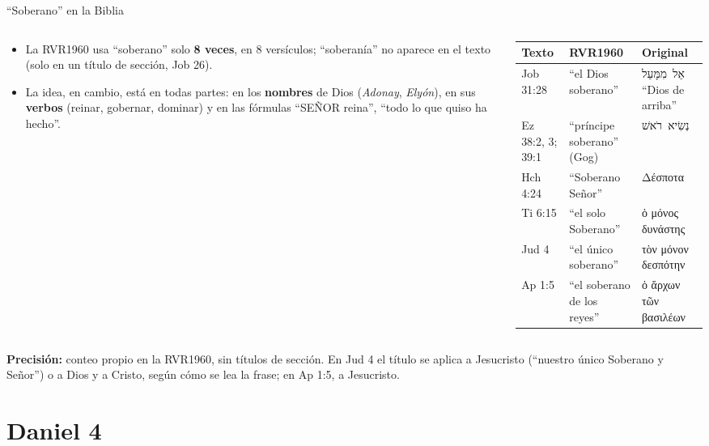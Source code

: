 \documentclass[hyperref={bookmarks=false},aspectratio=169]{beamer}
\newcommand{\heb}[1]{\mbox{\foreignlanguage{hebrew}{#1}}}
\newcommand{\grc}[1]{\foreignlanguage{ancientgreek}{#1}}
\newcommand{\SENOR}{S{\fontsize{0.78em}{1em}\selectfont EÑOR}}
\newcommand{\destacar}[1]{\textbf{\textcolor{azul}{#1}}}
\newcommand{\precision}[1]{{\footnotesize\color{gris}\textbf{Precisión:} #1}}
\begin{document}
\begin{frame}{``Soberano'' en la Biblia}
\begin{columns}[c,onlytextwidth]
\begin{column}{0.40\textwidth}\footnotesize
\begin{itemize}
\item La RVR1960 usa ``soberano'' solo \textbf{8 veces}, en 8 versículos; ``soberanía'' no aparece en el texto (solo en un título de sección, Job 26).
\item La idea, en cambio, está en todas partes: en los \destacar{nombres} de Dios (\emph{Adonay}, \emph{Elyón}), en sus \destacar{verbos} (reinar, gobernar, dominar) y en las fórmulas ``\SENOR{} reina'', ``todo lo que quiso ha hecho''.
\end{itemize}
\end{column}
\begin{column}{0.58\textwidth}
\scriptsize\renewcommand{\arraystretch}{1.12}
\begin{tabular}{@{}>{\RaggedRight\arraybackslash}p{1.4cm}>{\RaggedRight\arraybackslash}p{2.5cm}>{\RaggedRight\arraybackslash}p{2.8cm}@{}}
\toprule
\textbf{Texto} & \textbf{RVR1960} & \textbf{Original} \\ \midrule
Job 31:28 & ``el Dios soberano'' & \heb{אֵל מִמָּעַל} ``Dios de arriba'' \\
Ez 38:2, 3; 39:1 & ``príncipe soberano'' (Gog) & \heb{נְשִׂיא רֹאשׁ} \\
Hch 4:24 & ``Soberano Señor'' & \grc{Δέσποτα} \\
1 Ti 6:15 & ``el solo Soberano'' & \grc{ὁ μόνος δυνάστης} \\
Jud 4 & ``el único soberano'' & \grc{τὸν μόνον δεσπότην} \\
Ap 1:5 & ``el soberano de los reyes'' & \grc{ὁ ἄρχων τῶν βασιλέων} \\
\bottomrule
\end{tabular}
\end{column}
\end{columns}\par\smallskip
\precision{conteo propio en la RVR1960, sin títulos de sección. En Jud 4 el título se aplica a Jesucristo (``nuestro único Soberano y Señor'') o a Dios y a Cristo, según cómo se lea la frase; en Ap 1:5, a Jesucristo.}
\end{frame}

\section{Daniel 4}
\end{document}
